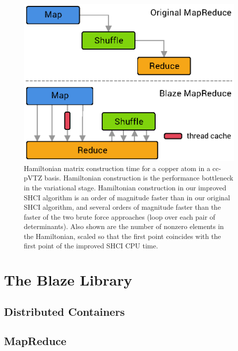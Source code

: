 \documentclass{sigkddExp}
\begin{document}
\begin{figure}
  \begin{center}
  \includegraphics[width=0.9\linewidth]{mrDiff.eps}
  \end{center}
  \vspace{-0.5cm}
  \caption{Hamiltonian matrix construction time for a copper atom in a cc-pVTZ basis. Hamiltonian construction is the performance bottleneck in the variational stage.
Hamiltonian construction in our improved SHCI algorithm is an order of magnitude faster than in
our original SHCI algorithm, and several orders of magnitude faster than the faster of the two brute force
approaches (loop over each pair of determinants).
Also shown are the number of nonzero elements in the Hamiltonian, scaled so that the first point coincides with
the first point of the improved SHCI CPU time.}
  \label{fig:mrdiff}
\end{figure}

\section{The Blaze Library}


\subsection{Distributed Containers}

\subsection{MapReduce}
\end{document}
